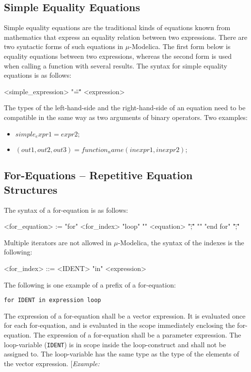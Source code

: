 \documentclass[11pt,a4paper,notitlepage]{report}
\begin{document}
\subsection{Simple Equality Equations} \label{equations:simpleequality}

Simple equality equations are the traditional kinds of equations known from mathematics that express an equality relation between two expressions. There are two syntactic forms of such equations in $\mu$-Modelica. The first form below is equality equations between two expressions, whereas the second form is used when calling a function with several results. The syntax for simple equality equations is as follows:
\begin{grammar}
  <simple_expression> "\"=\"" <expression>
\end{grammar}
The types of the left-hand-side and the right-hand-side of an equation need to be compatible in the same way as two arguments of binary operators.
Two examples:
\begin{itemize}
\item $simple_expr1 = expr2;$ 
\item $(out1, out2, out3) = function_name(inexpr1, inexpr2);$
\end{itemize}

\subsection{For-Equations – Repetitive Equation Structures}

The syntax of a for-equation is as follows:
\begin{grammar}
<for_equation> := "for" <for_index> "loop"
  "{" <equation> "\";\"" "}"
"end for" "\";\""
\end{grammar}
Multiple iterators are not allowed in $\mu$-Modelica, the syntax of the indexes is the following:
\begin{grammar}
<for_index> ::=
	<IDENT>  "in" <expression>
\end{grammar}

The following is one example of a prefix of a for-equation:
\begin{verbatim}
for IDENT in expression loop
\end{verbatim}

The expression of a for-equation shall be a vector expression. It is evaluated once for each for-equation, and is evaluated in the scope immediately enclosing the for-equation. The expression of a for-equation shall be a parameter expression. The loop-variable (\verb"IDENT") is in scope inside the loop-construct and shall not be assigned to. The loop-variable has the same type as the type of the elements of the vector expression.
[\emph{Example:}
\end{document}
